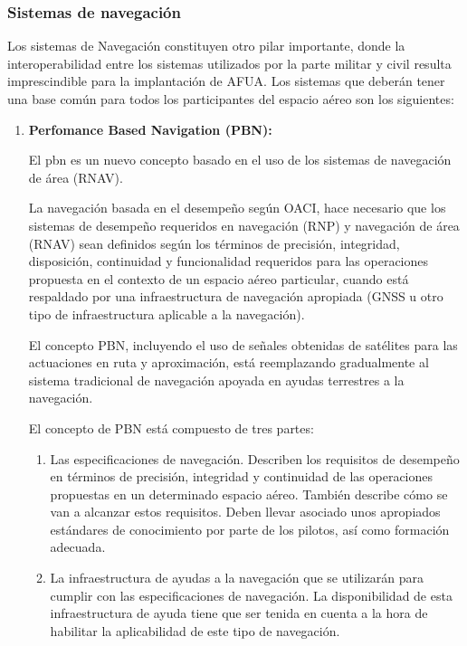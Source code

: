 \subsubsection{Sistemas de navegación}

Los sistemas de Navegación constituyen otro pilar importante, donde la interoperabilidad entre los sistemas utilizados por la parte militar y civil resulta imprescindible para la implantación de AFUA. Los sistemas que deberán tener una base común para todos los participantes del espacio aéreo son los siguientes:

\begin{enumerate}
    \item \textbf{Perfomance Based Navigation (PBN):}
    
    El \acrfull{pbn} es un nuevo concepto basado en el uso de los sistemas de navegación de área (RNAV). 

    La navegación basada en el desempeño según OACI, hace necesario que los sistemas de desempeño requeridos en navegación (RNP) y navegación de área (RNAV) sean definidos según los términos de precisión, integridad, disposición, continuidad y funcionalidad requeridos para las operaciones propuesta en el contexto de un espacio aéreo particular, cuando está respaldado por una infraestructura de navegación apropiada (GNSS u otro tipo de infraestructura aplicable a la navegación).
    
    El concepto PBN, incluyendo el uso de señales obtenidas de satélites para las actuaciones en ruta y aproximación, está reemplazando gradualmente al sistema tradicional de navegación apoyada en ayudas terrestres a la navegación.
    
    El concepto de PBN está compuesto de tres partes:
    
    \begin{enumerate}
        \item Las especificaciones de navegación. Describen los requisitos de desempeño en términos de precisión, integridad y continuidad de las operaciones propuestas en un determinado espacio aéreo. También describe cómo se van a alcanzar estos requisitos. Deben llevar asociado unos apropiados estándares de conocimiento por parte de los pilotos, así como formación adecuada.
        
        \item La infraestructura de ayudas a la navegación que se utilizarán para cumplir con las especificaciones de navegación. La disponibilidad de esta infraestructura de ayuda tiene que ser tenida en cuenta a la hora de habilitar la aplicabilidad de este tipo de navegación.
        

\end{enumerate}
\end{enumerate}
